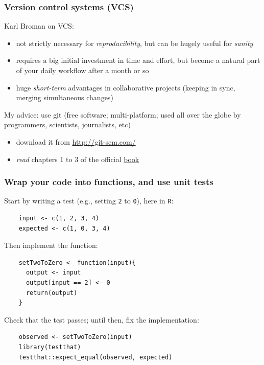 \documentclass[c]{beamer} %
\begin{document}
\begin{frame}
  \frametitle{Version control systems (VCS)}
  Karl Broman on VCS:
  \begin{itemize}
  \item not strictly necessary for \emph{reproducibility}, but can be hugely useful for \emph{sanity}
  \item requires a big initial investment in time and effort, but become a natural part of your daily workflow after a month or so
  \item huge \emph{short-term} advantages in collaborative projects (keeping in sync, merging simultaneous changes)
  \end{itemize}
  
  \bigskip
  \pause
  
  My advice: use \alert{git} (free software; multi-platform; used all over the globe by programmers, scientists, journalists, etc)
  \begin{itemize}
  \item download it from \url{http://git-scm.com/}
  \item \emph{read} chapters 1 to 3 of the official \href{http://git-scm.com/book/en/v2}{book}
  \end{itemize}
\end{frame}

\begin{frame}[fragile]
  \frametitle{Wrap your code into functions, and use unit tests}
  Start by writing a test (e.g., setting \verb+2+ to \verb+0+), here in \verb+R+:
  \begin{lstlisting}
    input <- c(1, 2, 3, 4)
    expected <- c(1, 0, 3, 4)
  \end{lstlisting}

  \bigskip
  \pause

  Then implement the function:
  \begin{lstlisting}
    setTwoToZero <- function(input){
      output <- input
      output[input == 2] <- 0
      return(output)
    }
  \end{lstlisting}
  
  \bigskip
  \pause
  
  Check that the test passes; until then, fix the implementation:
  \begin{lstlisting}
    observed <- setTwoToZero(input)
    library(testthat)
    testthat::expect_equal(observed, expected)
  \end{lstlisting}
\end{frame}
\end{document}
